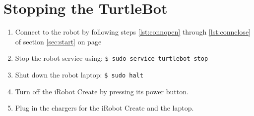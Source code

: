 \documentclass{article}
\begin{document}
\section{Stopping the TurtleBot}
\begin{enumerate}
\item{Connect to the robot by following steps \ref{lst:connopen} through \ref{lst:connclose} of section \ref{sec:start} on page \pageref{sec:start}}
\item{Stop the robot service using: \texttt{\$\ sudo service turtlebot stop}}
\item{Shut down the robot laptop: \texttt{\$\ sudo halt}}
\item{Turn off the iRobot Create by pressing its power button.}
\item{Plug in the chargers for the iRobot Create and the laptop.}
\end{enumerate}
\end{document}
